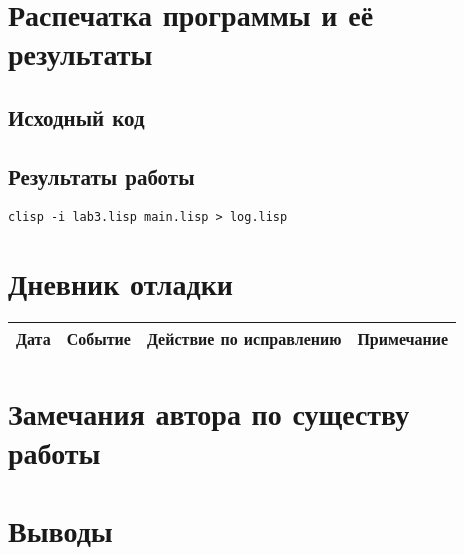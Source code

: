 \documentclass[12pt]{article}
\begin{document}
\section{Распечатка программы и её результаты}

\subsection{Исходный код}

\subsection{Результаты работы}
\lstinline{clisp -i lab3.lisp main.lisp > log.lisp}

\section{Дневник отладки}
\noindent
\begin{tabularx}{\linewidth}{|c|X|X|X|}
\hline
Дата & Событие & Действие по исправлению & Примечание \\
\hline
\end{tabularx}

\section{Замечания автора по существу работы}

\section{Выводы}
\end{document}
